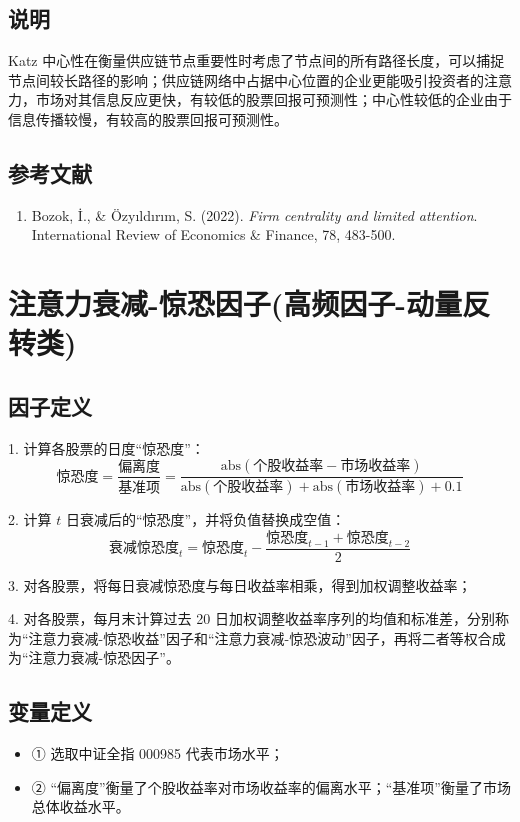 \documentclass{article}
\begin{document}
\subsection{说明}
Katz 中心性在衡量供应链节点重要性时考虑了节点间的所有路径长度，可以捕捉节点间较长路径的影响；供应链网络中占据中心位置的企业更能吸引投资者的注意力，市场对其信息反应更快，有较低的股票回报可预测性；中心性较低的企业由于信息传播较慢，有较高的股票回报可预测性。

\subsection{参考文献}
\begin{enumerate}
    \item Bozok, İ., \& Özyıldırım, S. (2022). \textit{Firm centrality and limited attention}. International Review of Economics \& Finance, 78, 483-500.
\end{enumerate}

\section{注意力衰减-惊恐因子(高频因子-动量反转类)}

\subsection{因子定义}

1. 计算各股票的日度“惊恐度”：
   \begin{equation}
       \text{惊恐度} = \frac{\text{偏离度}}{\text{基准项}} = \frac{\mathrm{abs}(\text{个股收益率} - \text{市场收益率})}{\mathrm{abs}(\text{个股收益率}) + \mathrm{abs}(\text{市场收益率}) + 0.1}
   \end{equation}

2. 计算 \( t \) 日衰减后的“惊恐度”，并将负值替换成空值：
   \begin{equation}
       \text{衰减惊恐度}_t = \text{惊恐度}_t - \frac{\text{惊恐度}_{t-1} + \text{惊恐度}_{t-2}}{2}
   \end{equation}

3. 对各股票，将每日衰减惊恐度与每日收益率相乘，得到加权调整收益率；

4. 对各股票，每月末计算过去 20 日加权调整收益率序列的均值和标准差，分别称为“注意力衰减-惊恐收益”因子和“注意力衰减-惊恐波动”因子，再将二者等权合成为“注意力衰减-惊恐因子”。

\subsection{变量定义}
\begin{itemize}
    \item ① 选取中证全指 000985 代表市场水平；
    \item ② “偏离度”衡量了个股收益率对市场收益率的偏离水平；“基准项”衡量了市场总体收益水平。
\end{itemize}
\end{document}
